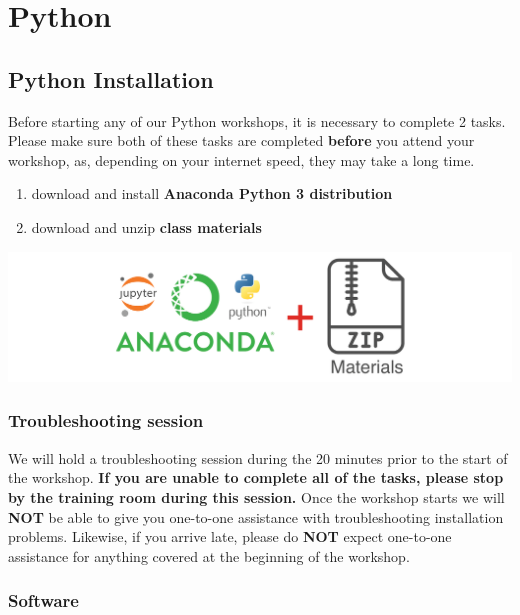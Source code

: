 \documentclass[
]{book}
\providecommand{\tightlist}{%
  \setlength{\itemsep}{0pt}\setlength{\parskip}{0pt}}
\begin{document}
\hypertarget{part-python}{%
\part{Python}\label{part-python}}

\hypertarget{python-installation}{%
\chapter{Python Installation}\label{python-installation}}

Before starting any of our Python workshops, it is necessary to complete 2 tasks. Please make sure both of these tasks are completed \textbf{before} you attend your workshop, as, depending on your internet speed, they may take a long time.

\begin{enumerate}
\def\labelenumi{\arabic{enumi}.}
\tightlist
\item
  download and install \textbf{Anaconda Python 3 distribution}
\item
  download and unzip \textbf{class materials}
\end{enumerate}

\includegraphics{Python/PythonInstall/images/install_software_Python.png}

\hypertarget{troubleshooting-session-1}{%
\section{Troubleshooting session}\label{troubleshooting-session-1}}

We will hold a troubleshooting session during the 20 minutes prior to the start of the workshop.
\textbf{If you are unable to complete all of the tasks, please stop by the training room during this session.}
Once the workshop starts we will \textbf{NOT} be able to give you one-to-one assistance with troubleshooting installation problems. Likewise, if you arrive late, please do \textbf{NOT} expect one-to-one assistance for anything covered at the beginning of the workshop.

\hypertarget{software-1}{%
\section{Software}\label{software-1}}
\end{document}
